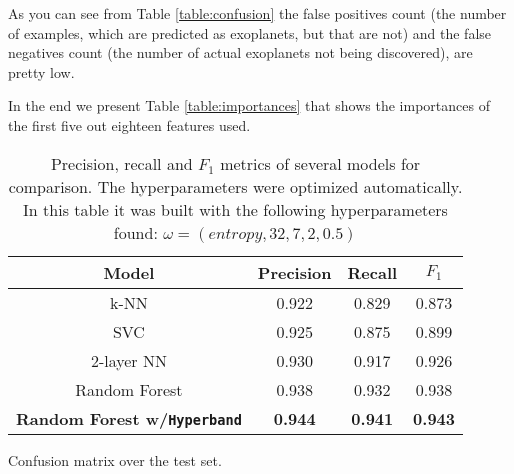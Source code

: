 \documentclass[11pt, a4paper]{article}
\begin{document}
  As you can see from Table \ref{table:confusion} the false positives count (the number of examples, which are predicted as exoplanets, but that are not) and the false negatives count (the number of actual exoplanets not being discovered), are pretty low.

  In the end we present Table \ref{table:importances} that shows the importances of the first five out eighteen features used.
  
  \begin{table}
    \centering
    \begin{tabular}{|c c c c|}
      \hline
      Model & Precision & Recall & $F_{1}$  \\
      \hline\hline
      k-NN & 0.922 & 0.829 & 0.873 \\
      \hline
      SVC & 0.925 & 0.875 & 0.899 \\
      \hline
      2-layer NN & 0.930 & 0.917 & 0.926 \\
      \hline
      Random Forest & 0.938 & 0.932 & 0.938 \\
      \hline
      \textbf{Random Forest w/\texttt{Hyperband}} & \textbf{0.944} & \textbf{0.941} & \textbf{0.943} \\
      \hline
    \end{tabular}
    \caption{Precision, recall and $F_{1}$ metrics of several models for comparison. The hyperparameters were optimized automatically. In this table it was built with the following hyperparameters found: $\omega = (entropy, 32, 7, 2, 0.5)$}
    \label{table:benchmark}
  \end{table}
  
  \begin{table}[h]
    \centering
    \caption{Confusion matrix over the test set.}
    \label{table:confusion}
  \end{table}
\end{document}

